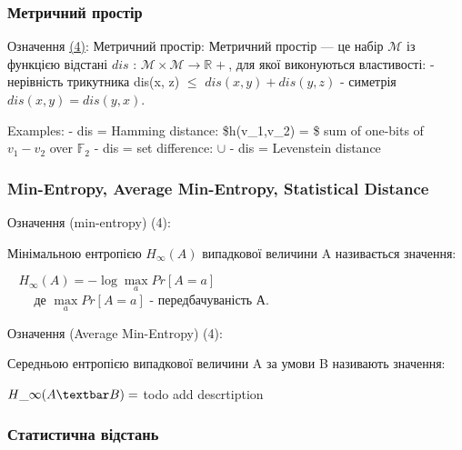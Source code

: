 \documentclass[11pt]{article}
\begin{document}
    \hypertarget{ux43cux435ux442ux440ux438ux447ux43dux438ux439-ux43fux440ux43eux441ux442ux456ux440}{%
\subsubsection{Метричний
простір}\label{ux43cux435ux442ux440ux438ux447ux43dux438ux439-ux43fux440ux43eux441ux442ux456ux440}}

Означення \hyperref[література]{(4)}: Метричний простір: Метричний
простір --- це набір \(\mathcal{M}\) із функцією відстані
\(\textit{dis}\) :
$\mathcal{M}\times\mathcal{M}\longrightarrow \mathbb{R}^{}+ $, для
якої виконуються властивості: - нерівність трикутника dis(x, z) $\leq$
\(\textit{dis}(x, y) + \textit{dis}(y, z)\) - симетрія
\(\textit{dis}(x, y) = \textit{dis}(y, x)\).

Examples: - dis = Hamming distance: \$h(v\_1,v\_2) = \$ sum of one-bits
of \(v_1-v_2\) over \(\mathbb{F}_2\) - dis = set difference: \(\cup\) -
dis = Levenstein distance

    \hypertarget{min-entropy-average-min-entropy-statistical-distance}{%
\subsubsection{Min-Entropy, Average Min-Entropy, Statistical
Distance}\label{min-entropy-average-min-entropy-statistical-distance}}

Означення (min-entropy) (4):

Мінімальною ентропією \(H_\infty(A)\) випадкової величини A називається
значення:

\(~~~~H_\infty(A) = -\log{\underset{a}{\max}}{Pr[A = a]}\)\\
\(~~~~~~~~\) де \(\underset{a}{\max}{Pr[A = a]}\) - передбачуваність А.

Означення (Average Min-Entropy) (4):

Середньою ентропією випадкової величини A за умови B називають значення:

$\overset{\text{~}}{H}\_\infty(A\textbar B) = $ todo add descrtiption

    \hypertarget{ux441ux442ux430ux442ux438ux441ux442ux438ux447ux43dux430-ux432ux456ux434ux441ux442ux430ux43dux44c}{%
\subsubsection{Статистична
відстань}\label{ux441ux442ux430ux442ux438ux441ux442ux438ux447ux43dux430-ux432ux456ux434ux441ux442ux430ux43dux44c}}
\end{document}
